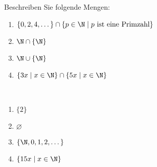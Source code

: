 \begin{example}
    Beschreiben Sie folgende Mengen:
    \begin{enumerate}
        \item $\{0,2,4,\dots \}\cap \{p\in\N\mid p\text{ ist eine Primzahl} \}$
        \item $\N\cap\{\N\}$
        \item $\N\cup\{\N\}$
        \item $\{3x\mid x\in\N \} \cap \{5x\mid x\in\N \}$
    \end{enumerate}
    \begin{example}
        {~
            \begin{enumerate}
                \item $\{2\}$
                \item $\varnothing$
                \item $\{\N,0,1,2,\dots \}$
                \item $\{15x\mid x\in\N \}$
            \end{enumerate}
        }{~
            \answerspace{3cm}}
    \end{example}
\end{example}

